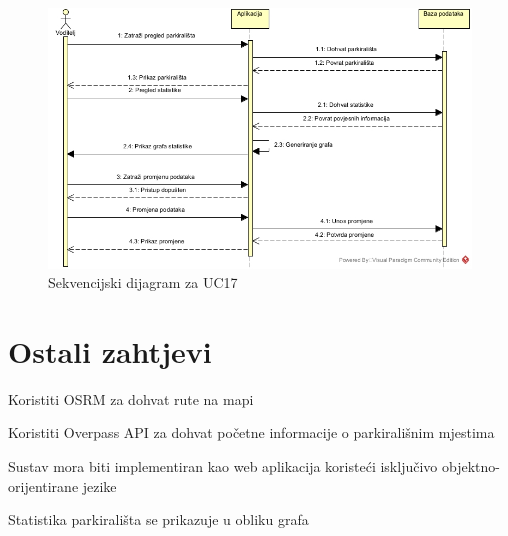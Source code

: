 \begin{figure}[H]
\centering
\includegraphics[width=\textwidth]{slike/SD_UC17.JPG} 
\caption{Sekvencijski dijagram za UC17}
\label{fig:promjene11} 
\end{figure}

\eject

\section{Ostali zahtjevi}


\begin{packed_enum}

\item Koristiti OSRM za dohvat rute na mapi
\item Koristiti Overpass API za dohvat početne informacije o parkirališnim mjestima
\item Sustav mora biti implementiran kao web aplikacija koristeći isključivo objektno-orijentirane jezike
\item Statistika parkirališta se prikazuje u obliku grafa

\end{packed_enum}




